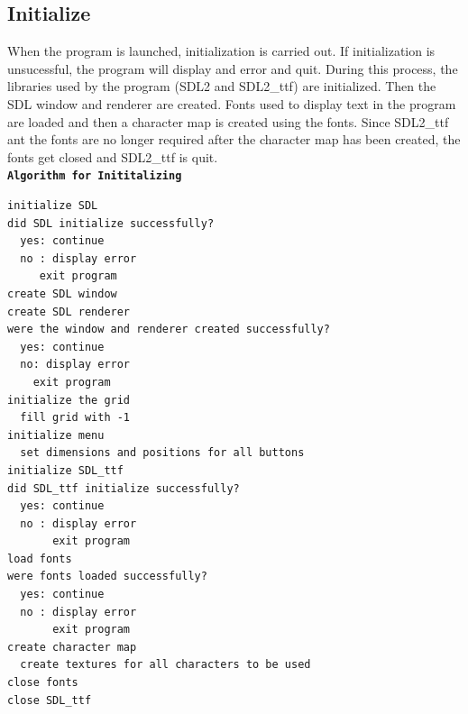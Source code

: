 \documentclass[report]{subfiles}
\begin{document}
    \subsection{Initialize}
    When the program is launched, initialization is carried out. If initialization is unsucessful, the program will display and error and quit. During this process, the libraries used by the program (SDL2 and SDL2\_ttf) are initialized. Then the SDL window and renderer are created. Fonts used to display text in the program are loaded and then a character map is created using the fonts. Since SDL2\_ttf ant the fonts are no longer required after the character map has been created, the fonts get closed and SDL2\_ttf is quit.\\
        \textbf{\texttt{Algorithm for Inititalizing}}
        \begin{verbatim}
initialize SDL
did SDL initialize successfully?
  yes: continue
  no : display error
     exit program
create SDL window
create SDL renderer
were the window and renderer created successfully?
  yes: continue
  no: display error
    exit program
initialize the grid
  fill grid with -1
initialize menu
  set dimensions and positions for all buttons
initialize SDL_ttf
did SDL_ttf initialize successfully?
  yes: continue
  no : display error
       exit program
load fonts
were fonts loaded successfully?
  yes: continue
  no : display error
       exit program
create character map
  create textures for all characters to be used
close fonts
close SDL_ttf
        \end{verbatim}
\end{document}
